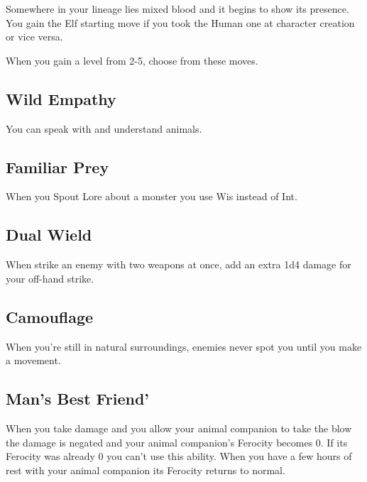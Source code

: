 Somewhere in your lineage lies mixed blood and it begins to show its presence. You gain the Elf starting move if you took the Human one at character creation or vice versa.

         
\startInstructions
When you gain a level from 2-5, choose from these moves.
\stopInstructions
         
\subsection{Wild Empathy}    
         

You can speak with and understand animals.

         
\subsection{Familiar Prey}    
         

When you Spout Lore about a monster you use Wis instead of Int.

         
\subsection{Dual Wield}    
         

When strike an enemy with two weapons at once, add an extra 1d4 damage for your off-hand strike.

         
\subsection{Camouflage}   
         

When you're still in natural surroundings, enemies never spot you until you make a movement.

         
\subsection{Man's Best Friend'}    
         

When you take damage and you allow your animal companion to take the blow the damage is negated and your animal companion's Ferocity becomes 0. If its Ferocity was already 0 you can't use this ability. When you have a few hours of rest with your animal companion its Ferocity returns to normal.

